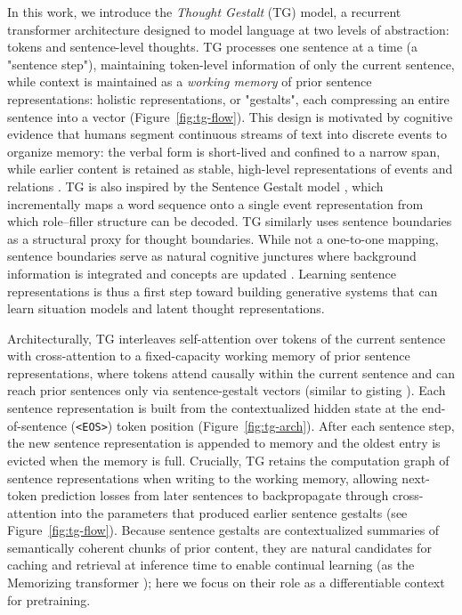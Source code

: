 \documentclass{article}
\begin{document}
In this work, we introduce the \emph{Thought Gestalt} (TG) model, a recurrent transformer architecture designed to model language at two levels of abstraction: tokens and sentence-level thoughts. TG processes one sentence at a time (a "sentence step"), maintaining  token-level information of only the current sentence, while context is maintained as a \emph{working memory} of prior sentence representations: holistic representations, or "gestalts", each compressing an entire sentence into a vector  (Figure~\ref{fig:tg-flow}). This design is motivated by cognitive evidence that humans segment continuous streams of text into discrete events to organize memory: the verbal form is short-lived and confined to a narrow span, while earlier content is retained as stable, high-level representations of events and relations \citep{radvansky2011event,jarvella1971syntactic,zwaan2016situation}. TG is also inspired by the Sentence Gestalt model \citep{stjohn1990learning}, which incrementally maps a word sequence onto a single event representation from which role--filler structure can be decoded. TG similarly uses sentence boundaries as a structural proxy for thought boundaries. While not a one-to-one mapping, sentence boundaries serve as natural cognitive junctures where background information is integrated and concepts are updated \citep{guzman2000maintaining,magliano2007situation}. Learning sentence representations is thus a first step toward building generative systems that can learn situation models and latent thought representations. 



Architecturally, TG interleaves self-attention over tokens of the current sentence with cross-attention to a fixed-capacity working memory of prior sentence representations, where tokens attend causally within the current sentence and can reach prior sentences only via sentence-gestalt vectors (similar to gisting \citep{mu2023gisting}). Each sentence representation is built from the contextualized hidden state at the end-of-sentence (\texttt{<EOS>}) token position (Figure~\ref{fig:tg-arch}). After each sentence step, the new sentence representation is appended to memory and the oldest entry is evicted when the memory is full. Crucially, TG retains the computation graph of sentence representations when writing to the working memory, allowing next-token prediction losses from later sentences to backpropagate through cross-attention into the parameters that produced earlier sentence gestalts (see Figure~\ref{fig:tg-flow}). Because sentence gestalts are contextualized summaries of semantically coherent chunks of prior content, they are natural candidates for caching and retrieval at inference time to enable continual learning (as the Memorizing transformer \citep{wu2022memorizing}); here we focus on their role as a differentiable context for pretraining.
\end{document}
